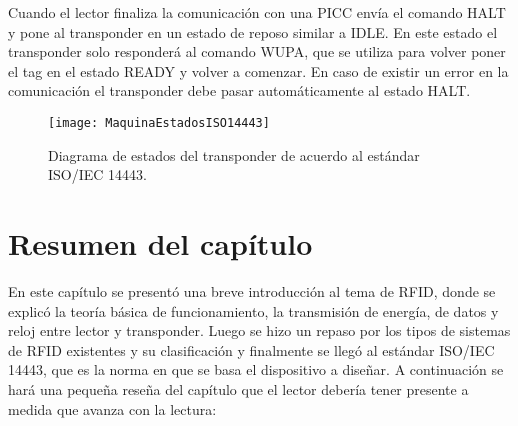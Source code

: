 Cuando el lector finaliza la comunicación con una PICC envía el comando HALT 
y pone al transponder en un estado de reposo similar a IDLE. En este estado 
el transponder solo responderá al comando WUPA, que se utiliza para volver 
poner el tag en el estado READY y volver a comenzar. En caso de existir un 
error en la comunicación el transponder debe pasar automáticamente al estado 
HALT.

\begin{figure}
	\centering
	\texttt{[image: MaquinaEstadosISO14443]}
	\caption{Diagrama de estados del transponder de acuerdo al estándar 
		ISO/IEC 14443.}
	\label{fig:MaquinaEstadosISO14443}
\end{figure}

\section{Resumen del capítulo}

En este capítulo se presentó una breve introducción al tema de RFID, 
donde se explicó la teoría básica de funcionamiento, la transmisión 
de energía, de datos y reloj entre lector y transponder. Luego se hizo 
un repaso por los tipos de sistemas de RFID existentes y su 
clasificación y finalmente se llegó al estándar ISO/IEC 14443, que 
es la norma en que se basa el dispositivo a diseñar. A continuación 
se hará una pequeña reseña del capítulo que el lector debería tener 
presente a medida que avanza con la lectura:

